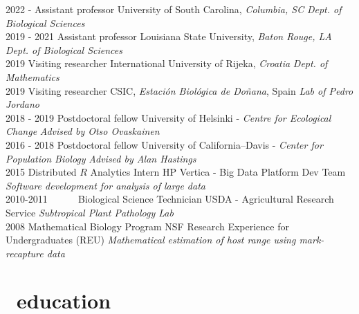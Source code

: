 \documentclass[]{CV}
\begin{document}
\begin{entrylist}

  \entry
    {2022 - }
    {Assistant professor}
    {University of South Carolina, \textit{Columbia, SC}}
    {\emph{Dept. of Biological Sciences}} \\
    
  \entry
    {2019 - 2021}
    {Assistant professor}
    {Louisiana State University, \textit{Baton Rouge, LA}}
    {\emph{Dept. of Biological Sciences}} \\


  \entry
    {2019}
    {Visiting researcher}
    {International University of Rijeka, \textit{Croatia}}
    {\emph{Dept. of Mathematics}} \\

  \entry
    {2019}
    {Visiting researcher}
    {CSIC, \textit{Estación Biológica de Do\~nana}, Spain}
    {\emph{Lab of Pedro Jordano}} \\

  \entry
    {2018 - 2019}
    {Postdoctoral fellow}
    {University of Helsinki - \textit{Centre for Ecological Change}}
    {\emph{Advised by Otso Ovaskainen}} \\


  \entry
    {2016 - 2018}
		{Postdoctoral fellow}
    {University of California--Davis - \textit{Center for Population Biology}}
    {\emph{Advised by Alan Hastings}} \\


  \entry
    {2015}
    {Distributed $R$ Analytics Intern}
    {HP Vertica - Big Data Platform Dev Team}
    {\emph{Software development for analysis of large data}} \\

  \entry
    {2010-2011 \ \ \ \ \ }
    {Biological Science Technician}
    {USDA - Agricultural Research Service}
    {\emph{Subtropical Plant Pathology Lab }} \\

  \entry
    {2008}
    {Mathematical Biology Program}
    {NSF Research Experience for Undergraduates (REU)}
    {\emph{Mathematical estimation of host range using mark-recapture data}}
\end{entrylist}







\section{\faGraduationCap \  education}
\end{document}
